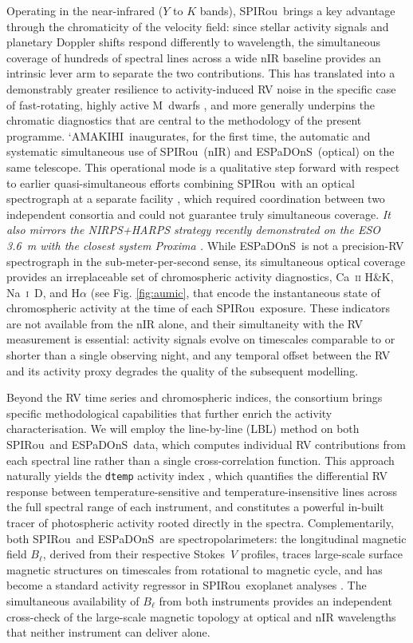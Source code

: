 \documentclass[
    traditabstract,
    longauth,
    onecolumn,
]{aa}
\def \amakihi{`AMAKIHI}
\def \spi{SPIRou}
\def \esp{ESPaDOnS}
\begin{document}
Operating in the near-infrared ($Y$ to $K$ bands), \spi\ brings a key advantage through the chromaticity of the velocity field: since stellar activity signals and planetary Doppler shifts respond differently to wavelength, the simultaneous coverage of hundreds of spectral lines across a wide nIR baseline provides an intrinsic lever arm to separate the two contributions.
This has translated into a demonstrably greater resilience to activity-induced RV noise in the specific case of fast-rotating, highly active M~dwarfs \citep{carmona_near-ir_2023, larue2025}, and more generally underpins the chromatic diagnostics that are central to the methodology of the present programme.
\amakihi\ inaugurates, for the first time, the automatic and systematic simultaneous use of \spi\ (nIR) and \esp\ (optical) on the same telescope.
This operational mode is a qualitative step forward with respect to earlier quasi-simultaneous efforts combining \spi\ with an optical spectrograph at a separate facility \citep{carmona_near-ir_2023}, which required coordination between two independent consortia and could not guarantee truly simultaneous coverage.
\textit{It also mirrors the NIRPS+HARPS strategy recently demonstrated on the ESO 3.6~m with the closest system Proxima \citep{suarez2025}.}
While \esp\ is not a precision-RV spectrograph in the sub-meter-per-second sense, its simultaneous optical coverage provides an irreplaceable set of chromospheric activity diagnostics, Ca~\textsc{ii} H\&K, Na~\textsc{i}~D, and H$\alpha$ (see Fig. \ref{fig:aumic}, that encode the instantaneous state of chromospheric activity at the time of each \spi\ exposure.
These indicators are not available from the nIR alone, and their simultaneity with the RV measurement is essential: activity signals evolve on timescales comparable to or shorter than a single observing night, and any temporal offset between the RV and its activity proxy degrades the quality of the subsequent modelling.



Beyond the RV time series and chromospheric indices, the consortium brings specific methodological capabilities that further enrich the activity characterisation. 
We will employ the line-by-line (LBL) method \citep{artigau_line-by-line_2022} on both \spi\ and \esp\ data, which computes individual RV contributions from each spectral line rather than a single cross-correlation function.
This approach naturally yields the \texttt{dtemp} activity index \citep{artigau_measuring_2024}, which quantifies the differential RV response between temperature-sensitive and temperature-insensitive lines across the full spectral range of each instrument, and constitutes a powerful in-built tracer of photospheric activity rooted directly in the spectra.
Complementarily, both \spi\ and \esp\ are spectropolarimeters: the longitudinal magnetic field $B_\ell$, derived from their respective Stokes~$V$ profiles, traces large-scale surface magnetic structures on timescales from rotational to magnetic cycle, and has become a standard activity regressor in \spi\ exoplanet analyses \citep{cortes2023}. 
The simultaneous availability of $B_\ell$ from both instruments provides an independent cross-check of the large-scale magnetic topology at optical and nIR wavelengths that neither instrument can deliver alone.
\end{document}
